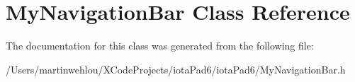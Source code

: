 \hypertarget{interface_my_navigation_bar}{
\section{MyNavigationBar Class Reference}
\label{interface_my_navigation_bar}
}


The documentation for this class was generated from the following file:\begin{DoxyCompactItemize}
\item 
/Users/martinwehlou/XCodeProjects/iotaPad6/iotaPad6/MyNavigationBar.h\end{DoxyCompactItemize}
